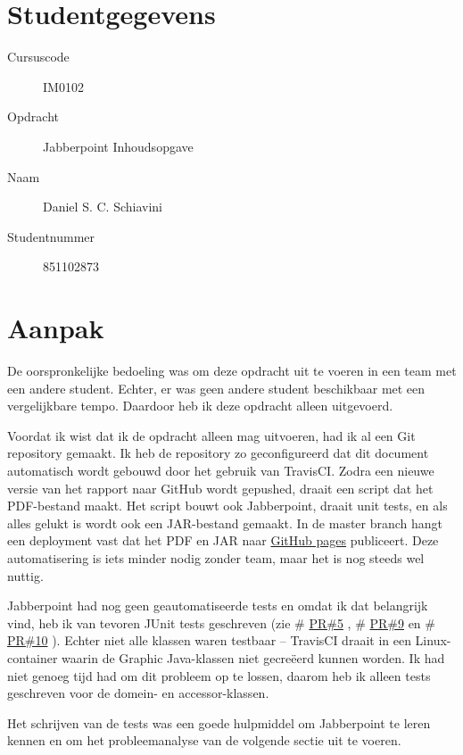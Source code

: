 \documentclass[a4paper]{article}
\makeatletter
\newcommand*{\repo}{\begingroup\@makeother\#\@repo}
\newcommand*{\@repo}[2]{%
  \href{https://github.com/DanielSchiavini/design-patterns-assignment/#1}{#2}%
  \endgroup}
\newcommand{\PR}[1]{\repo{pull/#1}{PR\##1}}
\makeatother
\begin{document}
\pagestyle{fancy}

\section*{Studentgegevens}
    \begin{description}
        \item [Cursuscode] IM0102
        \item [Opdracht] Jabberpoint Inhoudsopgave
        \item [Naam] Daniel S. C. Schiavini
        \item [Studentnummer] 851102873
    \end{description}

\section*{Aanpak}
    De oorspronkelijke bedoeling was om deze opdracht uit te voeren in een team met een andere student.
    Echter, er was geen andere student beschikbaar met een vergelijkbare tempo.
    Daardoor heb ik deze opdracht alleen uitgevoerd.

    Voordat ik wist dat ik de opdracht alleen mag uitvoeren, had ik al een Git repository gemaakt.
    Ik heb de repository zo geconfigureerd dat dit document automatisch wordt gebouwd door het gebruik van TravisCI.
    Zodra een nieuwe versie van het rapport naar GitHub wordt gepushed, draait een script dat het PDF-bestand maakt.
    Het script bouwt ook Jabberpoint, draait unit tests, en als alles gelukt is wordt ook een JAR-bestand gemaakt.
    In de master branch hangt een deployment vast dat het PDF en JAR naar \href{https://github.com/DanielSchiavini/design-patterns-assignment/tree/gh-pages}{GitHub pages} publiceert.
    Deze automatisering is iets minder nodig zonder team, maar het is nog steeds wel nuttig.

    Jabberpoint had nog geen geautomatiseerde tests en omdat ik dat belangrijk vind, heb ik van tevoren JUnit tests geschreven (zie \PR{5}, \PR{9} en \PR{10}).
    Echter niet alle klassen waren testbaar -- TravisCI draait in een Linux-container waarin de Graphic Java-klassen niet gecreëerd kunnen worden.
    Ik had niet genoeg tijd had om dit probleem op te lossen, daarom heb ik alleen tests geschreven voor de domein- en accessor-klassen.

    Het schrijven van de tests was een goede hulpmiddel om Jabberpoint te leren kennen en om het probleemanalyse van de volgende sectie uit te voeren.
\end{document}
